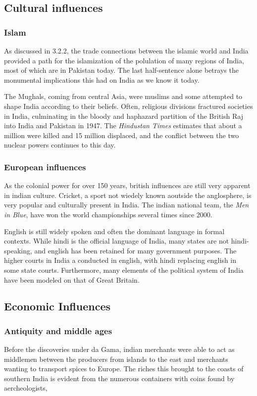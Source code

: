 \documentclass[11pt, a4paper, headings=standardclasses]{scrartcl}
\begin{document}
\subsection{Cultural influences}
\subsubsection{Islam}
As discussed in 3.2.2, the trade connections between the islamic world and India provided a path for the islamization of the polulation of many regions of India, most of which are in Pakistan today. The last half-sentence alone betrays the monumental implications this had on India as we know it today.

The Mughals, coming from central Asia, were muslims and some attempted to shape India according to their beliefs. Often, religious divisions fractured societies in India, culminating in the bloody and haphazard partition of the British Raj into India and Pakistan in 1947. The \textit{Hindustan Times} estimates that about a million were killed and 15 million displaced, and the conflict between the two nuclear powers continues to this day.\autocite{partition}

\subsubsection{European influences}

As the colonial power for over 150 years, british influences are still very apparent in indian culture. Cricket, a sport not wiedely known aoutside the anglosphere, is very popular and culturally present in India. The indian national team, the \textit{Men in Blue}, have won the world championships several times since 2000.

English is still widely spoken and often the dominant language in formal contexts. While hindi is the official language of India, many states are not hindi-speaking, and english has been retained for many government purposes. The higher courts in India a conducted in english, with hindi replacing english in some state courts. Furthermore, many elements of the political system of India have been modeled on that of Great Britain.

\subsection{Economic Influences}

\subsubsection{Antiquity and middle ages}

Before the discoveries under da Gama, indian merchants were able to act as middlemen between the producers from islands to the east and merchants wanting to transport spices to Europe. The riches this brought to the coasts of southern India is evident from the numerous containers with coins found by aercheologists,

\clearpage
\appendix
{}
\printbibliography
\end{document}
